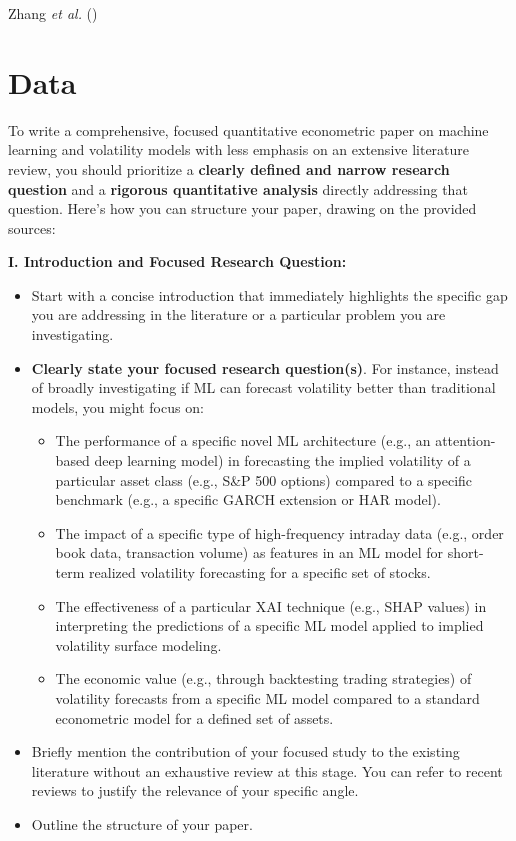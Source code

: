 \documentclass[11pt,preprint]{elsarticle}
\numberwithin{equation}{section}
\numberwithin{figure}{section}
\numberwithin{table}{section}
\def\tightlist{} %
\begin{document}
Zhang \emph{et al.} ()

\section*{Data}\label{data}

To write a comprehensive, focused quantitative econometric paper on
machine learning and volatility models with less emphasis on an
extensive literature review, you should prioritize a \textbf{clearly
defined and narrow research question} and a \textbf{rigorous
quantitative analysis} directly addressing that question. Here's how you
can structure your paper, drawing on the provided sources:

\textbf{I. Introduction and Focused Research Question:}

\begin{itemize}
\tightlist
\item
  Start with a concise introduction that immediately highlights the
  specific gap you are addressing in the literature or a particular
  problem you are investigating.
\item
  \textbf{Clearly state your focused research question(s)}. For
  instance, instead of broadly investigating if ML can forecast
  volatility better than traditional models, you might focus on:

  \begin{itemize}
  \tightlist
  \item
    The performance of a specific novel ML architecture (e.g., an
    attention-based deep learning model) in forecasting the implied
    volatility of a particular asset class (e.g., S\&P 500 options)
    compared to a specific benchmark (e.g., a specific GARCH extension
    or HAR model).
  \item
    The impact of a specific type of high-frequency intraday data (e.g.,
    order book data, transaction volume) as features in an ML model for
    short-term realized volatility forecasting for a specific set of
    stocks.
  \item
    The effectiveness of a particular XAI technique (e.g., SHAP values)
    in interpreting the predictions of a specific ML model applied to
    implied volatility surface modeling.
  \item
    The economic value (e.g., through backtesting trading strategies) of
    volatility forecasts from a specific ML model compared to a standard
    econometric model for a defined set of assets.
  \end{itemize}
\item
  Briefly mention the contribution of your focused study to the existing
  literature without an exhaustive review at this stage. You can refer
  to recent reviews to justify the relevance of your specific angle.
\item
  Outline the structure of your paper.
\end{itemize}
\end{document}
